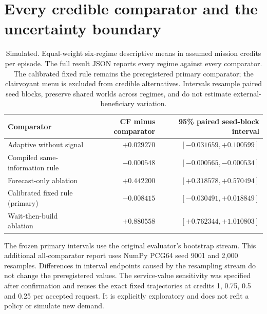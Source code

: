 \documentclass[11pt,a4paper]{article}
\newcommand{\simu}{\textsf{Simulated}}
\begin{document}
\section{Every credible comparator and the uncertainty boundary}\label{app:comparisons}
\begin{table}[ht]\centering\small
\begin{tabular}{@{}lrr@{}}\toprule
Comparator & CF minus comparator & 95\% paired seed-block interval\\\midrule
Adaptive without signal & $+0.029270$ & $[-0.031659,+0.100599]$\\
Compiled same-information rule & $-0.000548$ & $[-0.000565,-0.000534]$\\
Forecast-only ablation & $+0.442200$ & $[+0.318578,+0.570494]$\\
Calibrated fixed rule (primary) & $-0.008415$ & $[-0.030491,+0.018849]$\\
Wait-then-build ablation & $+0.880558$ & $[+0.762344,+1.010803]$\\
\bottomrule\end{tabular}
\caption{\simu{}. Equal-weight six-regime descriptive means in assumed mission credits per episode. The full result JSON reports every regime against every comparator. The calibrated fixed rule remains the preregistered primary comparator; the clairvoyant menu is excluded from credible alternatives. Intervals resample paired seed blocks, preserve shared worlds across regimes, and do not estimate external-beneficiary variation.}\end{table}

The frozen primary intervals use the original evaluator's bootstrap stream. This additional all-comparator report uses NumPy PCG64 seed 9001 and 2,000 resamples. Differences in interval endpoints caused by the resampling stream do not change the preregistered values. The service-value sensitivity was specified after confirmation and reuses the exact fixed trajectories at credits 1, 0.75, 0.5 and 0.25 per accepted request. It is explicitly exploratory and does not refit a policy or simulate new demand.

\FloatBarrier
\end{document}

